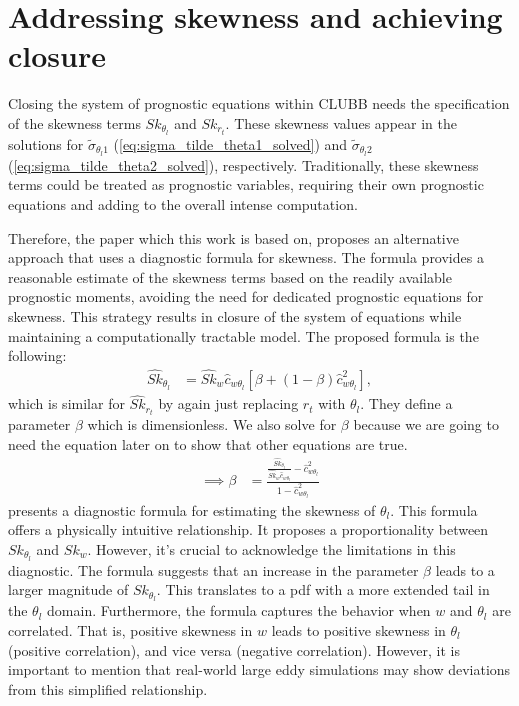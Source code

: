 \section{Addressing skewness and achieving closure}
\label{sec:addressing-skeweness-and-achieving-closure}

Closing the system of prognostic equations within \gls{CLUBB} needs the specification of
the skewness terms $Sk_{\theta_l}$ and $Sk_{r_t}$.
These skewness values appear in the solutions for $\tilde{\sigma}_{\theta_l 1}$ (\cref{eq:sigma_tilde_theta1_solved})
and $\tilde{\sigma}_{\theta_l 2}$ (\cref{eq:sigma_tilde_theta2_solved}), respectively.
Traditionally, these skewness terms could be treated as prognostic variables,
requiring their own prognostic equations and adding to the overall intense computation.

Therefore, the paper\cite{larson2005using} which this work is based on,
proposes an alternative approach that uses a diagnostic formula for skewness.
The formula provides a reasonable estimate of the skewness terms
based on the readily available prognostic moments,
avoiding the need for dedicated prognostic equations for skewness.
This strategy results in closure of the system of equations
while maintaining a computationally tractable model.
The proposed formula is the following:
\begin{align}
    \label{eq:Sk_hat_thl_beta}
    \widehat{Sk}_{\theta_l}
    &= \widehat{Sk}_w \widehat{c}_{w \theta_l} \left[\beta + (1-\beta) \widehat{c}_{w \theta_l}^2 \right],
\end{align}
which is similar for $\widehat{Sk}_{r_t}$ by again just replacing $r_t$ with $\theta_l$.
They define a parameter $\beta$ which is dimensionless.
We also solve for $\beta$ because we are going to need the equation later on to show that other equations are true.
\begin{align}
    \label{eq:beta}
    \implies \beta
    &=\frac{
        \frac{\widehat{Sk}_{\theta_l}}{\widehat{Sk}_w \widehat{c}_{w \theta_l}} - \widehat{c}_{w \theta_l}^2}
    {1 - \widehat{c}_{w \theta_l}^2}
\end{align}
 presents a diagnostic formula for estimating the skewness of $\theta_l$.
This formula offers a physically intuitive relationship.
It proposes a proportionality between $Sk_{\theta_l}$ and $Sk_w$.
However, it's crucial to acknowledge the limitations in this diagnostic.
The formula suggests that an increase in the parameter $\beta$ leads to a larger magnitude of $Sk_{\theta_l}$.
This translates to a \gls{pdf} with a more extended tail in the $\theta_l$ domain.
Furthermore, the formula captures the behavior when $w$
and $\theta_l$ are correlated.
That is, positive skewness in $w$ leads to positive skewness in $\theta_l$ (positive correlation),
and vice versa (negative correlation).
However, it is important to mention that real-world large eddy simulations
may show deviations from this simplified relationship.

